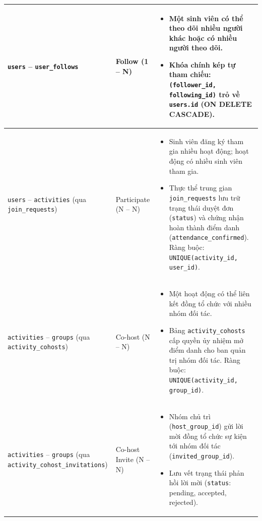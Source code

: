 \begin{longtable}{|p{}|p{}|p{}|}
    \texttt{users} -- \texttt{user\_follows} & Follow \newline (1 -- N) & 
    \begin{itemize}
        \item Một sinh viên có thể theo dõi nhiều người khác hoặc có nhiều người theo dõi.
        \item Khóa chính kép tự tham chiếu: \texttt{(follower\_id, following\_id)} trỏ về \texttt{users.id} (ON DELETE CASCADE).
    \end{itemize} \\ \hline
    
    \texttt{users} -- \texttt{activities} \newline (qua \texttt{join\_requests}) & Participate \newline (N -- N) & 
    \begin{itemize}
        \item Sinh viên đăng ký tham gia nhiều hoạt động; hoạt động có nhiều sinh viên tham gia.
        \item Thực thể trung gian \texttt{join\_requests} lưu trữ trạng thái duyệt đơn (\texttt{status}) và chứng nhận hoàn thành điểm danh (\texttt{attendance\_confirmed}). Ràng buộc: \texttt{UNIQUE(activity\_id, user\_id)}.
    \end{itemize} \\ \hline

    \texttt{activities} -- \texttt{groups} \newline (qua \texttt{activity\_cohosts}) & Co-host \newline (N -- N) & 
    \begin{itemize}
        \item Một hoạt động có thể liên kết đồng tổ chức với nhiều nhóm đối tác.
        \item Bảng \texttt{activity\_cohosts} cấp quyền ủy nhiệm mở điểm danh cho ban quản trị nhóm đối tác. Ràng buộc: \texttt{UNIQUE(activity\_id, group\_id)}.
    \end{itemize} \\ \hline

    \texttt{activities} -- \texttt{groups} \newline (qua \texttt{activity\_cohost\_invitations}) & Co-host Invite \newline (N -- N) & 
    \begin{itemize}
        \item Nhóm chủ trì (\texttt{host\_group\_id}) gửi lời mời đồng tổ chức sự kiện tới nhóm đối tác (\texttt{invited\_group\_id}).
        \item Lưu vết trạng thái phản hồi lời mời (\texttt{status}: pending, accepted, rejected).
    \end{itemize} \\ \hline


\end{longtable}
